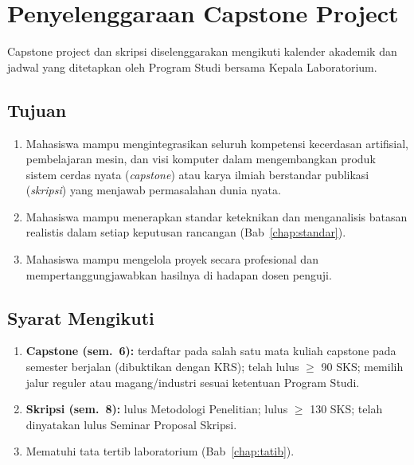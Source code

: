 \documentclass[12pt,a4paper]{report}
\begin{document}
\chapter{Penyelenggaraan Capstone Project}

Capstone project dan skripsi diselenggarakan mengikuti kalender akademik dan jadwal yang ditetapkan oleh Program Studi bersama Kepala Laboratorium.

\section{Tujuan}
\begin{enumerate}
\item Mahasiswa mampu mengintegrasikan seluruh kompetensi kecerdasan artifisial, pembelajaran mesin, dan visi komputer dalam mengembangkan produk sistem cerdas nyata (\emph{capstone}) atau karya ilmiah berstandar publikasi (\emph{skripsi}) yang menjawab permasalahan dunia nyata.
\item Mahasiswa mampu menerapkan standar keteknikan dan menganalisis batasan realistis dalam setiap keputusan rancangan (Bab~\ref{chap:standar}).
\item Mahasiswa mampu mengelola proyek secara profesional dan mempertanggungjawabkan hasilnya di hadapan dosen penguji.
\end{enumerate}

\section{Syarat Mengikuti}
\begin{enumerate}
\item \textbf{Capstone (sem.~6):} terdaftar pada salah satu mata kuliah capstone pada semester berjalan (dibuktikan dengan KRS); telah lulus $\geq$ 90 SKS; memilih jalur reguler atau magang/industri sesuai ketentuan Program Studi.
\item \textbf{Skripsi (sem.~8):} lulus Metodologi Penelitian; lulus $\geq$ 130 SKS; telah dinyatakan lulus Seminar Proposal Skripsi.
\item Mematuhi tata tertib laboratorium (Bab~\ref{chap:tatib}).
\end{enumerate}
\end{document}
